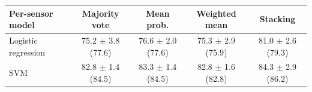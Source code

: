 \begin{tabular}{lcccc}
\toprule
\textbf{Per-sensor model} & \textbf{Majority vote} & \textbf{Mean prob.} & \textbf{Weighted mean} & \textbf{Stacking} \\
\midrule
Logistic regression & 75.2 $\pm$ 3.8 (77.6) & 76.6 $\pm$ 2.0 (77.6) & 75.3 $\pm$ 2.9 (75.9) & 81.0 $\pm$ 2.6 (79.3) \\
SVM & 82.8 $\pm$ 1.4 (84.5) & 83.3 $\pm$ 1.4 (84.5) & 82.8 $\pm$ 1.6 (82.8) & 84.3 $\pm$ 2.9 (86.2) \\
\bottomrule
\end{tabular}
